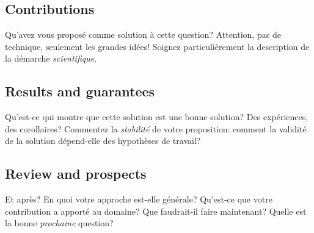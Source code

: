 \documentclass{article}
\newenvironment{point}[1]%
{\subsection*{#1}}%
{}
\begin{document}
\begin{point}{Contributions}

  Qu'avez vous proposé comme solution à cette question? Attention, pas
  de technique, seulement les grandes idées! Soignez particulièrement
  la description de la démarche \emph{scientifique}.
 
\end{point}

\begin{point}{Results and guarantees}

  Qu'est-ce qui montre que cette solution est une bonne solution? Des
  expériences, des corollaires? Commentez la \emph{stabilité} de votre
  proposition: comment la validité de la solution dépend-elle des
  hypothèses de travail?

\end{point}


\begin{point}{Review and prospects}
  
  Et après? En quoi votre approche est-elle générale? Qu'est-ce que
  votre contribution a apporté au domaine? Que faudrait-il faire
  maintenant? Quelle est la bonne \emph{prochaine} question?

\end{point}
\end{document}
